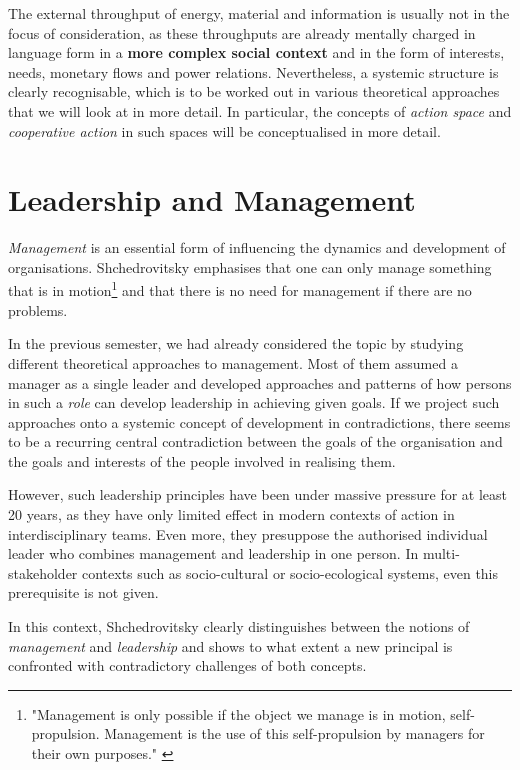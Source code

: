 \documentclass[11pt,a4paper]{article}
\begin{document}
The external throughput of energy, material and information is usually not in
the focus of consideration, as these throughputs are already mentally charged
in language form in a \textbf{more complex social context} and in the form of
interests, needs, monetary flows and power relations. Nevertheless, a systemic
structure is clearly recognisable, which is to be worked out in various
theoretical approaches that we will look at in more detail. In particular, the
concepts of \emph{action space} and \emph{cooperative action} in such spaces
will be conceptualised in more detail.

\section{Leadership and Management}

\emph{Management} is an essential form of influencing the dynamics and
development of organisations. Shchedrovitsky emphasises that one can only
manage something that is in motion\footnote{"Management is only possible if
  the object we manage is in motion, self-propulsion. Management is the use of
  this self-propulsion by managers for their own purposes." \cite[p. 28]{MSM}}
and that there is no need for management if there are no problems.

In the previous semester, we had already considered the topic by studying
different theoretical approaches to management.  Most of them assumed a
manager as a single leader and developed approaches and patterns of how
persons in such a \emph{role} can develop leadership in achieving given goals.
If we project such approaches onto a systemic concept of development in
contradictions, there seems to be a recurring central contradiction between
the goals of the organisation and the goals and interests of the people
involved in realising them.

However, such leadership principles have been under massive pressure for at
least 20 years, as they have only limited effect in modern contexts of action
in interdisciplinary teams. Even more, they presuppose the authorised
individual leader who combines management and leadership in one person. In
multi-stakeholder contexts such as socio-cultural or socio-ecological systems,
even this prerequisite is not given.

In this context, Shchedrovitsky clearly distinguishes between the notions of
\emph{management} and \emph{leadership} \cite[p. 27-30]{MSM} and shows to what
extent a new principal is confronted with contradictory challenges of both
concepts.
\end{document}
